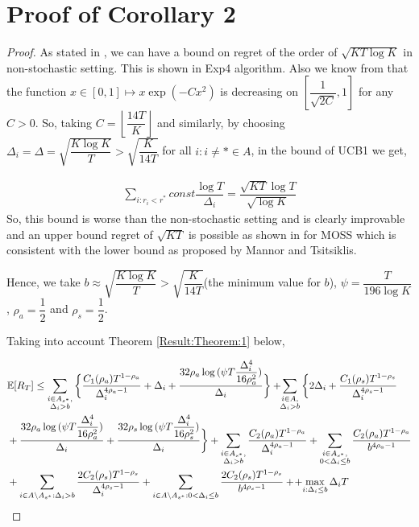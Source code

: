 \section{Proof of Corollary 2}
\label{App:Proof:Corollary:2}
\begin{proof}
As stated in \citet{auer2010ucb}, we can have a bound on regret of the order of $\sqrt{KT\log K}$ in non-stochastic setting. This is shown in Exp4\cite{auer2002nonstochastic} algorithm. Also we know from \citet{bubeck2011pure} that the function $x\in [0,1]\mapsto x\exp(-Cx^2)$ is  decreasing on $\left[\dfrac{1}{\sqrt{2C}},1\right ]$ for any $C>0$. So, taking $C=\left\lfloor \dfrac{14 T}{K}\right\rfloor$ and similarly, by choosing  $\Delta_{i}=\Delta=\sqrt{\dfrac{K\log K}{T}}>\sqrt{\dfrac{K}{14 T}}$ for all ${i:i\neq *}\in A$, in the bound of UCB1\cite{auer2002finite} we get,

\begin{align*}
\sum_{i:r_{i}<r^{*}}const \dfrac{\log T}{\Delta_{i}}=\dfrac{\sqrt{KT}\log T}{\sqrt{\log K}}
\end{align*}
So, this bound is worse than the non-stochastic setting and is clearly improvable and an upper bound regret of $\sqrt{KT}$ is possible as shown in \citet{audibert2009minimax} for MOSS which is consistent with the lower bound as proposed by Mannor and Tsitsiklis\cite{mannor2004sample}.

	Hence, we take $b\approx\sqrt{\dfrac{K\log K}{T}} > \sqrt{\dfrac{K}{14 T}}$(the minimum value for $b$), $\psi=\dfrac{T}{196 \log K}$, $\rho_{a}=\dfrac{1}{2}$ and $\rho_{s}=\dfrac{1}{2}$.
	
	Taking into account Theorem \ref{Result:Theorem:1} below, 
	
\begin{align*}
&\mathbb{E} [R_{T}]\leq 
\sum\limits_{\substack{i\in A_{s^{*}},\\\Delta_{i} > b}}\bigg\lbrace \dfrac{C_1(\rho_{a})T^{1-\rho_{a}}}{\Delta_{i}^{4\rho_{a}-1}} + \Delta_{i}
 + \frac{32\rho_{a}\log{(\psi T\dfrac{\Delta_{i}^{4}}{16\rho_{a}^{2}})}}{\Delta_{i}} \bigg\rbrace
 + \! \! \sum\limits_{\substack{i\in A,\\\Delta_{i} > b}} \bigg\lbrace 2\Delta_{i}+
\dfrac{C_1(\rho_{s})T^{1-\rho_{s}}}{\Delta_{i}^{4\rho_{s}-1}} \\
&+ \frac{32\rho_{a}\log{(\psi T\dfrac{\Delta_{i}^{4}}{16\rho_{a}^{2}})}}{\Delta_{i}} 
+ \dfrac{32\rho_{s}\log{(\psi T\dfrac{\Delta_{i}^{4}}{16\rho_{s}^{2}})}}{\Delta_{i}}\bigg\rbrace 
+ \sum\limits_{\substack{i\in A_{s^{*}},\\ \Delta_{i} > b}} 
\frac{C_2(\rho_{a})T^{1-\rho_{a}}}{\Delta_{i}^{4\rho_{a}-1}}
+\sum\limits_{\substack{i\in A_{s^{*}},\\0 < \Delta_{i}\leq b}}\frac{C_2(\rho_a)T^{1-\rho_{a}}}{b^{4\rho_{a} -1}}\\ 
 & + \sum_{i\in A\setminus A_{s^*}: \Delta_{i} > b}\dfrac{2C_{2}(\rho_{s})T^{1-\rho_{s}}}{\Delta_{i}^{4\rho_{s}-1}} +\sum_{i\in A\setminus A_{s^*}: 0 < \Delta_{i} \leq b}\dfrac{2C_{2}(\rho_{s})T^{1-\rho_{s}}}{b^{4\rho_{s}-1}} +
 \!+\! \max\limits_{i:\Delta_{i}\leq b}\Delta_{i}T
\end{align*}


\end{proof}
